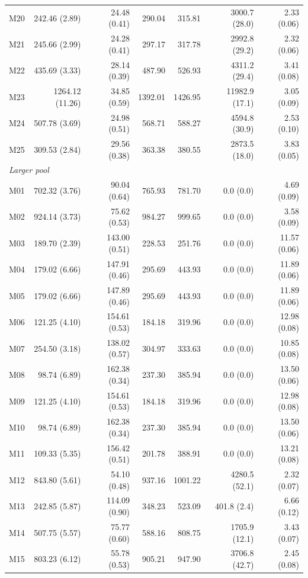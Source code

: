 \documentclass[11pt]{article}
\theoremstyle{remark}
\begin{document}
\begin{longtable}{lrrrrrr}
M20 & 242.46 (2.89) & 24.48 (0.41) & 290.04 & 315.81 & 3000.7 (28.0) & 2.33 (0.06) \\
M21 & 245.66 (2.99) & 24.28 (0.41) & 297.17 & 317.78 & 2992.8 (29.2) & 2.32 (0.06) \\
M22 & 435.69 (3.33) & 28.14 (0.39) & 487.90 & 526.93 & 4311.2 (29.4) & 3.41 (0.08) \\
M23 & 1264.12 (11.26) & 34.85 (0.59) & 1392.01 & 1426.95 & 11982.9 (17.1) & 3.05 (0.09) \\
M24 & 507.78 (3.69) & 24.98 (0.51) & 568.71 & 588.27 & 4594.8 (30.9) & 2.53 (0.10) \\
M25 & 309.53 (2.84) & 29.56 (0.38) & 363.38 & 380.55 & 2873.5 (18.0) & 3.83 (0.05) \\
\multicolumn{7}{l}{\textit{Larger pool}} \\
M01 & 702.32 (3.76) & 90.04 (0.64) & 765.93 & 781.70 & 0.0 (0.0) & 4.69 (0.09) \\
M02 & 924.14 (3.73) & 75.62 (0.53) & 984.27 & 999.65 & 0.0 (0.0) & 3.58 (0.09) \\
M03 & 189.70 (2.39) & 143.00 (0.51) & 228.53 & 251.76 & 0.0 (0.0) & 11.57 (0.06) \\
M04 & 179.02 (6.66) & 147.91 (0.46) & 295.69 & 443.93 & 0.0 (0.0) & 11.89 (0.06) \\
M05 & 179.02 (6.66) & 147.89 (0.46) & 295.69 & 443.93 & 0.0 (0.0) & 11.89 (0.06) \\
M06 & 121.25 (4.10) & 154.61 (0.53) & 184.18 & 319.96 & 0.0 (0.0) & 12.98 (0.08) \\
M07 & 254.50 (3.18) & 138.02 (0.57) & 304.97 & 333.63 & 0.0 (0.0) & 10.85 (0.08) \\
M08 & 98.74 (6.89) & 162.38 (0.34) & 237.30 & 385.94 & 0.0 (0.0) & 13.50 (0.06) \\
M09 & 121.25 (4.10) & 154.61 (0.53) & 184.18 & 319.96 & 0.0 (0.0) & 12.98 (0.08) \\
M10 & 98.74 (6.89) & 162.38 (0.34) & 237.30 & 385.94 & 0.0 (0.0) & 13.50 (0.06) \\
M11 & 109.33 (5.35) & 156.42 (0.51) & 201.78 & 388.91 & 0.0 (0.0) & 13.21 (0.08) \\
M12 & 843.80 (5.61) & 54.10 (0.48) & 937.16 & 1001.22 & 4280.5 (52.1) & 2.32 (0.07) \\
M13 & 242.85 (5.87) & 114.09 (0.90) & 348.23 & 523.09 & 401.8 (2.4) & 6.66 (0.12) \\
M14 & 507.75 (5.57) & 75.77 (0.60) & 588.16 & 808.75 & 1705.9 (12.1) & 3.43 (0.07) \\
M15 & 803.23 (6.12) & 55.78 (0.53) & 905.21 & 947.90 & 3706.8 (42.7) & 2.45 (0.08) \\

\end{longtable}
\end{document}
